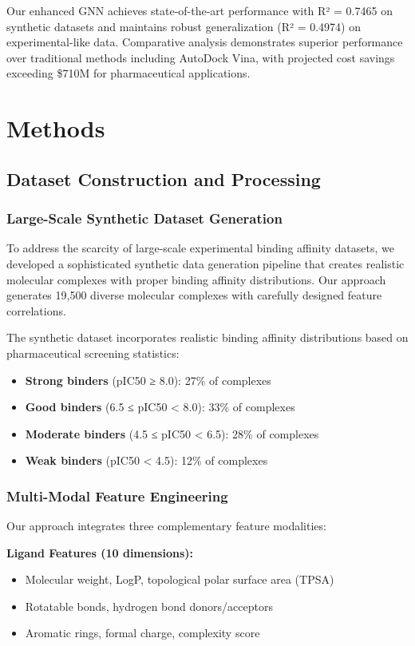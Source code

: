 \documentclass[11pt,a4paper]{article}
\begin{document}
Our enhanced GNN achieves state-of-the-art performance with R² = 0.7465 on synthetic datasets and maintains robust generalization (R² = 0.4974) on experimental-like data. Comparative analysis demonstrates superior performance over traditional methods including AutoDock Vina, with projected cost savings exceeding \$710M for pharmaceutical applications.

\section{Methods}

\subsection{Dataset Construction and Processing}

\subsubsection{Large-Scale Synthetic Dataset Generation}

To address the scarcity of large-scale experimental binding affinity datasets, we developed a sophisticated synthetic data generation pipeline that creates realistic molecular complexes with proper binding affinity distributions. Our approach generates 19,500 diverse molecular complexes with carefully designed feature correlations.

The synthetic dataset incorporates realistic binding affinity distributions based on pharmaceutical screening statistics:
\begin{itemize}
    \item \textbf{Strong binders} (pIC50 ≥ 8.0): 27\% of complexes
    \item \textbf{Good binders} (6.5 ≤ pIC50 < 8.0): 33\% of complexes  
    \item \textbf{Moderate binders} (4.5 ≤ pIC50 < 6.5): 28\% of complexes
    \item \textbf{Weak binders} (pIC50 < 4.5): 12\% of complexes
\end{itemize}

\subsubsection{Multi-Modal Feature Engineering}

Our approach integrates three complementary feature modalities:

\textbf{Ligand Features (10 dimensions):}
\begin{itemize}
    \item Molecular weight, LogP, topological polar surface area (TPSA)
    \item Rotatable bonds, hydrogen bond donors/acceptors
    \item Aromatic rings, formal charge, complexity score
\end{itemize}
\end{document}

